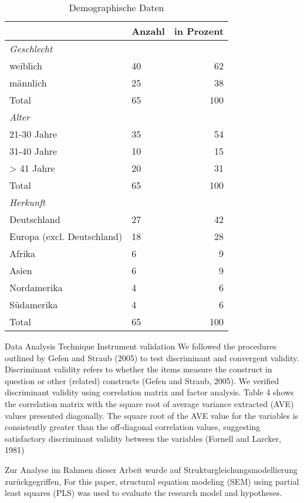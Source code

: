 \begin{table}[ht] 
\caption{Demographische Daten}
\label{tab:Demographische Daten} 
\begin{tabular}{@{}lp{5cm}r@{}} \toprule

 & \textbf{Anzahl}&\textbf{in Prozent} \\ \midrule

\textit{Geschlecht}		& 				& \\ 
weiblich 				&  40 			& 62 \\
männlich				&  25			& 38 \\ 
Total					&  65			& 100 \\
\textit{Alter}			& 				&   \\
21-30 Jahre				&  35			& 54 \\
31-40 Jahre				&  10			& 15	  \\
> 41 Jahre				&  20 			& 31 \\
Total 					&  65			& 100 \\
\textit{Herkunft}		&				&   \\
Deutschland				& 27 			& 42  \\
Europa (excl. Deutschland) &18			& 28  \\
Afrika 					& 6				& 9   \\
Asien 					& 6				& 9   \\
Nordamerika				& 4				& 6   \\
Südamerika				& 4				& 6	 \\
Total					& 65				& 100  \\ 
  \bottomrule

\end{tabular}	
\end{table}


Data Analysis Technique
Instrument validation
We followed the procedures outlined by Gefen and Straub (2005) to test discriminant and convergent validity. Discriminant validity refers to whether the items measure the construct in question or other (related) constructs (Gefen and Straub, 2005). We verified discriminant validity using correlation matrix and factor analysis. Table 4 shows the correlation matrix with the square root of average variance extracted (AVE) values presented diagonally. The square root of the AVE value for the variables is consistently greater than the off-diagonal correlation values, suggesting satisfactory discriminant validity between the variables (Fornell and Larcker, 1981)

Zur Analyse im Rahmen dieser Arbeit wurde auf Strukturgleichungsmodellierung zurückgegriffen, 
For this paper, structural equation modeling (SEM) using partial least squares (PLS) was used to evaluate the research model and hypotheses.



